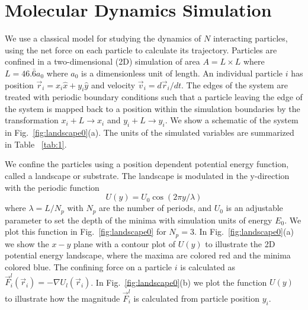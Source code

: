 \documentclass[twocolumn,preprintnumbers,amsmath,amssymb,aps,prx]{revtex4}
\begin{document}
\section{Molecular Dynamics Simulation}
\label{sec:MD}
We use a classical model for 
studying the dynamics of $N$ interacting particles,
using the net force on each particle to calculate
its trajectory.
Particles are confined in a two-dimensional (2D) 
simulation of area $A = L \times L$ where $L=46.\bar{6} a_0$
where $a_0$ is a dimensionless unit of length.
An individual particle $i$ has
position $\vec{r}_i = x_i \hat{x} + y_i \hat{y}$
and velocity $\vec{v}_i = d\vec{r}_i/dt$.
The edges of the system are treated with
periodic boundary conditions
such that a particle leaving the edge of the system is mapped
back to a position within the simulation boundaries 
by the transformation $x_i+L \rightarrow x_i$ and $y_i+L \rightarrow y_i$.
We show a schematic of the system in Fig.~\ref{fig:landscape0}(a).
The units of the simulated variables are summarized in Table ~\ref{tab:1}.

We confine the particles using a position dependent 
potential energy function, called a landscape or substrate.
% 
The landscape is modulated in the y-direction
with the periodic function 
 \begin{equation}
   U(y) = U_0 \cos{(2 \pi y / \lambda)}
     \label{eq:ysubstrate}
\end{equation}
 where $\lambda=L/N_p$ with $N_p$ are the number of periods,
 and $U_0$ is an adjustable parameter
 to set the depth of the minima
 with simulation units of energy $E_0$. 
 We plot this function in 
 Fig.~\ref{fig:landscape0}
 for $N_p = 3$. %
 In Fig.~\ref{fig:landscape0}(a) we show 
 the $x-y$ plane with a contour plot of $U(y)$ %
 to illustrate
 the 2D potential energy landscape,
 where 
 the maxima are colored red and the minima colored blue.
 The confining force on a particle $i$
 is calculated as 
 $\vec{F}^{l}_i(\vec{r}_i) = -\nabla U_l(\vec{r}_i)$.
 In Fig.~\ref{fig:landscape0}(b) we plot the function
 $U(y)$ to illustrate how the magnitude
 $\vec{F}^{l}_i$ is calculated from particle position $y_i$.  
 
\end{document}
